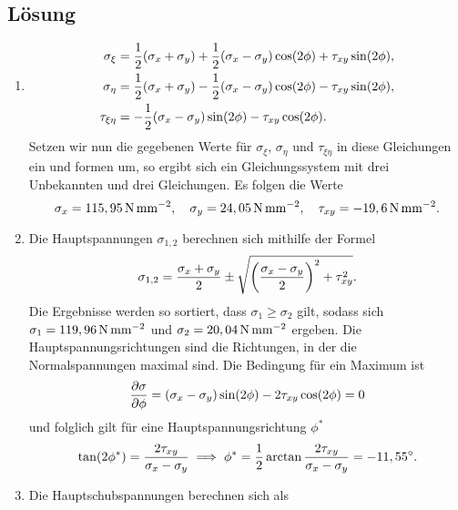 \documentclass{exercise}
\begin{document}
    \subsection*{Lösung}
    \begin{enumerate}
        \item
        \begin{align*}
            \sigma_\xi &= \frac{1}{2}\parentheses*{\sigma_x + \sigma_y} + \frac{1}{2}\parentheses*{\sigma_x - \sigma_y}\cos\parentheses*{2\phi} + \tau_{xy}\sin\parentheses*{2\phi},\\
            \sigma_\eta &= \frac{1}{2}\parentheses*{\sigma_x + \sigma_y} - \frac{1}{2}\parentheses*{\sigma_x - \sigma_y}\cos\parentheses*{2\phi} - \tau_{xy}\sin\parentheses*{2\phi},\\
            \tau_{\xi\eta} &= -\frac{1}{2}\parentheses*{\sigma_x - \sigma_y}\sin\parentheses*{2\phi} - \tau_{xy}\cos\parentheses*{2\phi}.
        \end{align*}
        Setzen wir nun die gegebenen Werte für \(\sigma_\xi\), \(\sigma_\eta\) und \(\tau_{\xi\eta}\) in diese Gleichungen ein und formen um, so ergibt sich ein Gleichungssystem mit drei Unbekannten und drei Gleichungen.
        Es folgen die Werte
        \[
            \sigma_x = 115,95\sis{\newton\per\milli\meter\squared}, \quad \sigma_y = 24,05\sis{\newton\per\milli\meter\squared}, \quad \tau_{xy} = -19,6\sis{\newton\per\milli\meter\squared}.
        \]
        \item Die Hauptspannungen \(\sigma_{1, 2}\) berechnen sich mithilfe der Formel
        \[
            \sigma_{1, 2} = \frac{\sigma_x + \sigma_y}{2} \pm \sqrt{\parentheses*{\frac{\sigma_x - \sigma_y}{2}}^2 + \tau_{xy}^2}.
        \]
        Die Ergebnisse werden so sortiert, dass \(\sigma_1 \ge \sigma_2\) gilt, sodass sich \(\sigma_1 = 119,96\sis{\newton\per\milli\meter\squared}\) und \(\sigma_2 = 20,04\sis{\newton\per\milli\meter\squared}\) ergeben.
        Die Hauptspannungsrichtungen sind die Richtungen, in der die Normalspannungen maximal sind.
        Die Bedingung für ein Maximum ist
        \[
            \frac{\partial\sigma}{\partial\phi} = \parentheses*{\sigma_x - \sigma_y}\sin\parentheses*{2\phi} - 2\tau_{xy}\cos\parentheses*{2\phi} = 0
        \]
        und folglich gilt für eine Hauptspannungsrichtung \(\phi^*\)
        \[
            \tan\parentheses*{2\phi^*} = \frac{2\tau_{xy}}{\sigma_x - \sigma_y} \implies \phi^* = \frac{1}{2}\arctan\frac{2\tau_{xy}}{\sigma_x - \sigma_y} = -11,55^\circ.
        \]
        \item Die Hauptschubspannungen berechnen sich als

\end{enumerate}
\end{document}
